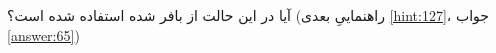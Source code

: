 \section{}
\paragraph{}\label{hint:213}
آیا در این حالت از  بافر شده استفاده شده است؟ (راهنماییِ بعدی \ref{hint:127}، جواب \ref{answer:65})